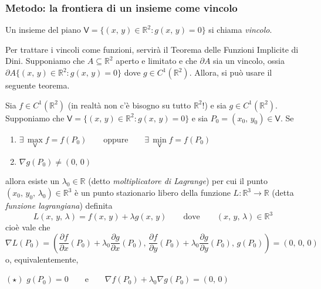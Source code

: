 \subsubsection{ Metodo: la frontiera di un insieme come vincolo}
\begin{definition}
Un insieme del piano $\mathsf{V} = \lbrace (x,\,y) \in \mathbb{R}^2 : g(x,\,y) = 0 \rbrace$ si chiama \emph{vincolo}.
\end{definition}
Per trattare i vincoli come funzioni, servirà il Teorema delle Funzioni Implicite di Dini. Supponiamo che $A \subseteq \mathbb{R}^2$ aperto e limitato e che $\partial A$ sia un vincolo, ossia $\partial A \lbrace (x,\,y) \in \mathbb{R}^2 : g(x,\,y) = 0 \rbrace$ dove $g \in C^1(\mathbb{R}^2)$. Allora, si può usare il seguente teorema.

\begin{thm}
Sia $f \in C^1(\mathbb{R}^2)$ (in realtà non c'è bisogno su tutto $\mathbb{R}^2$!) e sia $g \in C^1(\mathbb{R}^2)$. Supponiamo che $\mathsf{V} = \lbrace (x,\,y) \in \mathbb{R}^2 : g(x,\,y) = 0 \rbrace$ e sia $P_0 = (x_0,\,y_0) \in \mathsf{V}$. Se
\begin{enumerate}[labelindent=\parindent,leftmargin=*,label=\textnormal{(\roman*)},start=1]
\item $\exists \, \underset{\mathsf{V}}{\max} f = f(P_0) \qquad \text{oppure} \qquad \exists \, \underset{\mathsf{V}}{\min} f = f(P_0)$
\item $\nabla g(P_0) \neq (0,\,0)$
\end{enumerate}
allora esiste un $\lambda_0 \in \mathbb{R}$ (detto \emph{moltiplicatore di Lagrange}) per cui il punto $(x_0,\,y_0,\,\lambda_0) \in \mathbb{R}^3$ è un punto stazionario libero della funzione $L : \mathbb{R}^3 \longrightarrow \mathbb{R}$ (detta \emph{funzione lagrangiana}) definita
$$
L(x,\,y,\,\lambda) = f(x,\,y) + \lambda g(x,\,y) \qquad \text{dove} \qquad (x,\,y,\,\lambda) \in \mathbb{R}^3
$$
cioè vale che
$$
\nabla L(P_0) = \left( \frac{\partial f}{\partial x}(P_0) + \lambda_0\frac{\partial g}{\partial x}(P_0),\, \frac{\partial f}{\partial y}(P_0) + \lambda_0\frac{\partial g}{\partial y}(P_0),\, g(P_0) \right) = (0,\,0,\,0)
$$
o, equivalentemente,
\begin{center}
$\mathrm{(\star)}$
\hfill
$\displaystyle
g(P_0) = 0 \qquad \text{e} \qquad \nabla f(P_0) + \lambda_0 \nabla g(P_0) = (0,\,0)
$
\hfill \null \\
\end{center}
\end{thm}

